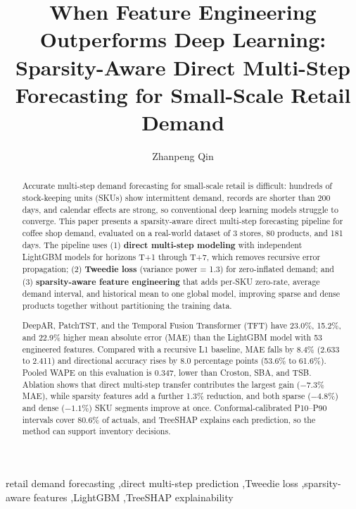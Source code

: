 \documentclass[review,authoryear]{elsarticle}
\begin{document}
\begin{frontmatter}

\title{When Feature Engineering Outperforms Deep Learning: Sparsity-Aware Direct Multi-Step Forecasting for Small-Scale Retail Demand}

\author[1]{Zhanpeng Qin}

\address[1]{ByteDance, Beijing, China}

\begin{abstract}

Accurate multi-step demand forecasting for small-scale retail is difficult: hundreds of stock-keeping units (SKUs) show intermittent demand, records are shorter than 200 days, and calendar effects are strong, so conventional deep learning models struggle to converge. This paper presents a sparsity-aware direct multi-step forecasting pipeline for coffee shop demand, evaluated on a real-world dataset of 3 stores, 80 products, and 181 days. The pipeline uses (1) \textbf{direct multi-step modeling} with independent LightGBM models for horizons T+1 through T+7, which removes recursive error propagation; (2) \textbf{Tweedie loss} (variance power = 1.3) for zero-inflated demand; and (3) \textbf{sparsity-aware feature engineering} that adds per-SKU zero-rate, average demand interval, and historical mean to one global model, improving sparse and dense products together without partitioning the training data.

DeepAR, PatchTST, and the Temporal Fusion Transformer (TFT) have 23.0\%, 15.2\%, and 22.9\% higher mean absolute error (MAE) than the LightGBM model with 53 engineered features. Compared with a recursive L1 baseline, MAE falls by 8.4\% (2.633 to 2.411) and directional accuracy rises by 8.0 percentage points (53.6\% to 61.6\%). Pooled WAPE on this evaluation is 0.347, lower than Croston, SBA, and TSB. Ablation shows that direct multi-step transfer contributes the largest gain ($-7.3$\% MAE), while sparsity features add a further 1.3\% reduction, and both sparse ($-4.8$\%) and dense ($-1.1$\%) SKU segments improve at once. Conformal-calibrated P10--P90 intervals cover 80.6\% of actuals, and TreeSHAP explains each prediction, so the method can support inventory decisions.

\end{abstract}

\begin{keyword}
retail demand forecasting \sep direct multi-step prediction \sep Tweedie loss \sep sparsity-aware features \sep LightGBM \sep TreeSHAP explainability
\end{keyword}

\end{frontmatter}
\end{document}
